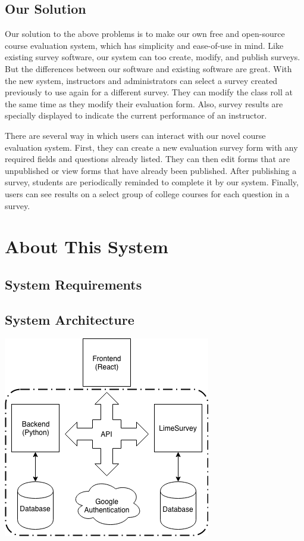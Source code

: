 \documentclass{article}
\begin{document}
\subsection{Our Solution}

Our solution to the above problems is to make our own free and open-source course evaluation system, which has simplicity and ease-of-use in mind. Like existing survey software, our system can too create, modify, and publish surveys. But the differences between our software and existing software are great. With the new system, instructors and administrators can select a survey created previously to use again for a different survey. They can modify the class roll at the same time as they modify their evaluation form. Also, survey results are specially displayed to indicate the current performance of an instructor.

There are several way in which users can interact with our novel course evaluation system. First, they can create a new evaluation survey form with any required fields and questions already listed. They can then edit forms that are unpublished or view forms that have already been published. After publishing a survey, students are periodically reminded to complete it by our system. Finally, users can see results on a select group of college courses for each question in a survey.

\section{About This System}

\subsection{System Requirements}

\subsection{System Architecture}

\begin{center}
\vspace{2mm}
\label{fig:componentdiagram}
{\includegraphics[scale=.75]{images/component_diagram.png}} 
\end{center}
\end{document}
